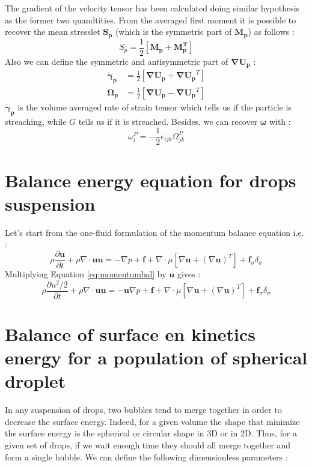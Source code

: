 \documentclass[10pt,a4paper,openany]{article}
\theoremstyle{mytheoremstyle}
\theoremstyle{mytheoremstyle}
\theoremstyle{myproblemstyle}
\newcommand{\refq}[1]{Equation \ref{#1}}
\begin{document}
The gradient of the velocity tensor has been calculated doing similar hypothesis as the former two quandtities. 
From the averaged first moment it is possible to recover the mean stresslet $\bm{S_p}$ (which is the symmetric part of $\bm{M_p}$) as follows :
\begin{equation}
    S_p = \frac{1}{2}\left[\bm{M_p}+\bm{M_p^T}\right]
\end{equation}
Also we can define the symmetric and antisymmetric part of $\bm{\nabla U_p}$  :
\begin{align}
    \bm{\dot{\gamma}_p} &= \frac{1}{2}\left[\bm{\nabla U_p}+\bm{\nabla U_p}^T\right]\\
    \bm{\Omega_p}& = \frac{1}{2}\left[\bm{\nabla U_p}-\bm{\nabla U_p}^T\right]
\end{align}
$\bm{\dot{\gamma}_p}$ is the volume averaged rate of strain tensor which tells us if the particle is streaching, while $G$ tells us if it is streached. 
Besides, we can recover $\bm{\omega}$ with :
\begin{equation}
    \omega^P_i = -\frac{1}{2}\epsilon_{ijk}\Omega^P_{jk}
\end{equation}


\part{Balance energy equation for drops suspension}
Let's start from the one-fluid formulation of the momentum balance equation i.e. : 
\begin{equation}
    \rho \frac{\partial \bm{u}}{\partial t}+\rho\nabla\cdot\bm{uu} = 
    -\nabla p +\bm{f} +\nabla\cdot\mu\left[\nabla\bm{u}+(\nabla\bm{u})^T\right] + \bm{f}_\sigma\delta_\sigma
    \label{eq:momentumbal}
\end{equation}
Multiplying \refq{eq:momentumbal} by $\bm{u}$ gives :
\begin{equation}
    \rho \frac{\partial u^2/2}{\partial t}+\rho\nabla\cdot\bm{uu} = 
    -\bm{u}\nabla p +\bm{f} +\nabla\cdot\mu\left[\nabla\bm{u}+(\nabla\bm{u})^T\right] + \bm{f}_\sigma\delta_\sigma
    \label{eq:momentumbal}
\end{equation}

\part{Balance of surface en kinetics energy for a population of spherical droplet}

In any suspension of drops,
two bubbles tend to merge together in order to decrease the surface energy.
Indeed, for a given volume the shape that minimize the surface energy is the spherical or circular shape in 3D or in 2D.
Thus, for a given set of drops, if we wait enough time they should all merge together and form a single bubble. 
We can define the following dimensionless parameters :
\end{document}
